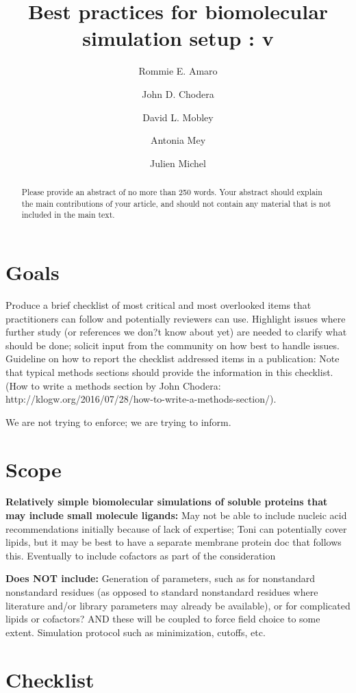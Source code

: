 \documentclass[9pt]{livecoms}
\title{Best practices for biomolecular simulation setup : v\versionnumber}
\author[1*]{Rommie E. Amaro}
\author[2*]{John D. Chodera}
\author[3*]{David L. Mobley}
\author[4*]{Antonia Mey}
\author[4*]{Julien Michel}
\affil[1]{Institution 1}
\affil[2]{Institution 2}
\affil[3]{Departments of Pharmaceutical Sciences and Chemistry, University of California, Irvine}
\affil[4]{Institution 4}
\begin{document}
\maketitle

\begin{abstract}
Please provide an abstract of no more than 250 words. Your abstract should explain the main contributions of your article, and should not contain any material that is not included in the main text.
\end{abstract}

\section{Goals}

Produce a brief checklist of most critical and most overlooked items that practitioners can follow and potentially reviewers can use.
Highlight issues where further study (or references we don?t know about yet) are needed to clarify what should be done; solicit input from the community on how best to handle issues.
Guideline on how to report the checklist addressed items in a publication: Note that typical methods sections should provide the information in this checklist. (How to write a methods section by John Chodera: http://klogw.org/2016/07/28/how-to-write-a-methods-section/).

We are not trying to enforce; we are trying to inform.

\section{Scope}


\textbf{Relatively simple biomolecular simulations of soluble proteins that may include small molecule ligands: }
May not be able to include nucleic acid recommendations initially because of lack of expertise; Toni can potentially cover lipids, but it may be best to have a separate membrane protein doc that follows this.
Eventually to include cofactors as part of the consideration

\textbf{Does NOT include: }
Generation of parameters, such as for nonstandard nonstandard residues (as opposed to standard nonstandard residues where literature and/or library parameters may already be available), or for complicated lipids or cofactors? AND these will be coupled to force field choice to some extent.
Simulation protocol such as minimization, cutoffs, etc. 

\section{Checklist}
\end{document}
